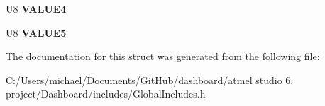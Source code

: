 \begin{DoxyCompactItemize}
\item 
\hypertarget{struct_dashboard___t_x__10__un_1_1_dashboard__10__st_ababa6cb2d01dcdb9c0241e09a4405dd0}{U8 {\bfseries V\-A\-L\-U\-E4}}\label{struct_dashboard___t_x__10__un_1_1_dashboard__10__st_ababa6cb2d01dcdb9c0241e09a4405dd0}

\item 
\hypertarget{struct_dashboard___t_x__10__un_1_1_dashboard__10__st_ac49c584a2af35d1646fd45272dd6a3d8}{U8 {\bfseries V\-A\-L\-U\-E5}}\label{struct_dashboard___t_x__10__un_1_1_dashboard__10__st_ac49c584a2af35d1646fd45272dd6a3d8}

\end{DoxyCompactItemize}


The documentation for this struct was generated from the following file\-:\begin{DoxyCompactItemize}
\item 
C\-:/\-Users/michael/\-Documents/\-Git\-Hub/dashboard/atmel studio 6. project/\-Dashboard/includes/Global\-Includes.\-h\end{DoxyCompactItemize}
